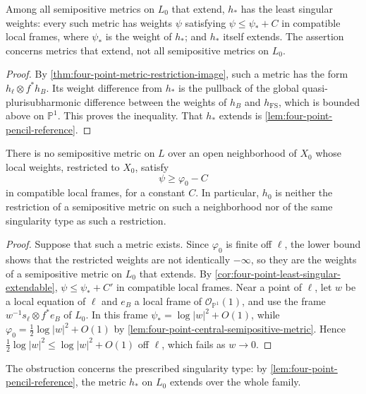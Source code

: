 \begin{corollary}\label{cor:four-point-least-singular-extendable}
Among all semipositive metrics on $L_0$ that extend, $h_*$ has the least singular weights: every such metric has weights $\psi$ satisfying $\psi\leq\psi_*+C$ in compatible local frames, where $\psi_*$ is the weight of $h_*$; and $h_*$ itself extends. The assertion concerns metrics that extend, not all semipositive metrics on $L_0$.
\end{corollary}
\begin{proof}
By \cref{thm:four-point-metric-restriction-image}, such a metric has the form $h_\ell\otimes f^*h_B$. Its weight difference from $h_*$ is the pullback of the global quasi-plurisubharmonic difference between the weights of $h_B$ and $h_{\mathrm{FS}}$, which is bounded above on $\mathbb P^1$. This proves the inequality. That $h_*$ extends is \cref{lem:four-point-pencil-reference}.
\end{proof}

\begin{theorem}\label{thm:four-point-semipositive-metric-nonextension}
There is no semipositive metric on $L$ over an open neighborhood of $X_0$ whose local weights, restricted to $X_0$, satisfy
\[
 \psi\geq\varphi_0-C
\]
in compatible local frames, for a constant $C$. In particular, $h_0$ is neither the restriction of a semipositive metric on such a neighborhood nor of the same singularity type as such a restriction.
\end{theorem}
\begin{proof}
Suppose that such a metric exists. Since $\varphi_0$ is finite off $\ell$, the lower bound shows that the restricted weights are not identically $-\infty$, so they are the weights of a semipositive metric on $L_0$ that extends. By \cref{cor:four-point-least-singular-extendable}, $\psi\leq\psi_*+C'$ in compatible local frames. Near a point of $\ell$, let $w$ be a local equation of $\ell$ and $e_B$ a local frame of $\mathcal O_{\mathbb P^1}(1)$, and use the frame $w^{-1}s_\ell\otimes f^*e_B$ of $L_0$. In this frame $\psi_*=\log|w|^2+O(1)$, while $\varphi_0=\tfrac12\log|w|^2+O(1)$ by \cref{lem:four-point-central-semipositive-metric}. Hence $\tfrac12\log|w|^2\leq\log|w|^2+O(1)$ off $\ell$, which fails as $w\to0$.
\end{proof}

The obstruction concerns the prescribed singularity type: by \cref{lem:four-point-pencil-reference}, the metric $h_*$ on $L_0$ extends over the whole family.
